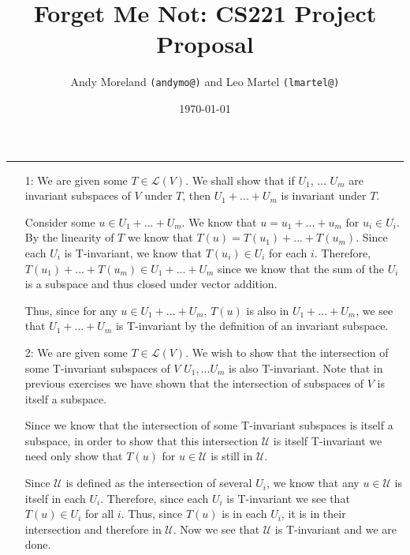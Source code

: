 \documentclass[12pt]{article}
\title{Forget Me Not: CS221 Project Proposal}
\author{Andy Moreland \texttt{(andymo@)} and Leo Martel \texttt{(lmartel@)}}
\date{\today}
\newcommand{\U}{\mathcal{U}}
\renewcommand{\L}{\mathcal{L}}
\begin{document}
\maketitle
\rule{\linewidth}{0.4pt}

\clearpage

\vspace{-0.3in}
\setlength{\parskip}{10pt plus 1pt minus 1pt}
\pagestyle{fancy}

\begin{enumerate}
\section*{Book Exercises}
\item[1:]
  We are given some $T \in \L(V)$. We shall show that if $U_1$, ... $U_m$ are invariant subspaces of $V$ under $T$, then $U_1 + ... + U_m$ is invariant under $T$.

  Consider some $u \in U_1 + ... + U_m$. We know that $u = u_1 + ... + u_m$ for $u_i \in U_i$. By the linearity of $T$ we know that $T(u) = T(u_1) + ... + T(u_m)$. Since each $U_i$ is T-invariant, we know that $T(u_i) \in U_i$ for each $i$.  Therefore, $T(u_1) + ... + T(u_m) \in U_1 + ... + U_m$ since we know that the sum of the $U_i$ is a subspace and thus closed under vector addition. 

  Thus, since for any $u \in U_1 + ... + U_m$, $T(u)$ is also in $U_1 + ... + U_m$, we see that $U_1 + ... + U_m$ is T-invariant by the definition of an invariant subspace.

\item[2:]
  We are given some $T \in \L(V)$. We wish to show that the intersection of some T-invariant subspaces of $V$ $U_1, ... U_m$ is also T-invariant. Note that in previous exercises we have shown that the intersection of subspaces of $V$ is itself a subspace.

  Since we know that the intersection of some T-invariant subspaces is itself a subspace, in order to show that this intersection $\U$ is itself T-invariant we need only show that $T(u)$ for $u \in \U$ is still in $\U$.

  Since $\U$ is defined as the intersection of several $U_i$, we know that any $u \in \U$ is itself in each $U_i$. Therefore, since each $U_i$ is T-invariant we see that $T(u) \in U_i$ for all $i$.  Thus, since $T(u)$ is in each $U_i$, it is in their intersection and therefore in $\U$. Now we see that $\U$ is T-invariant and we are done.


\end{enumerate}
\end{document}

